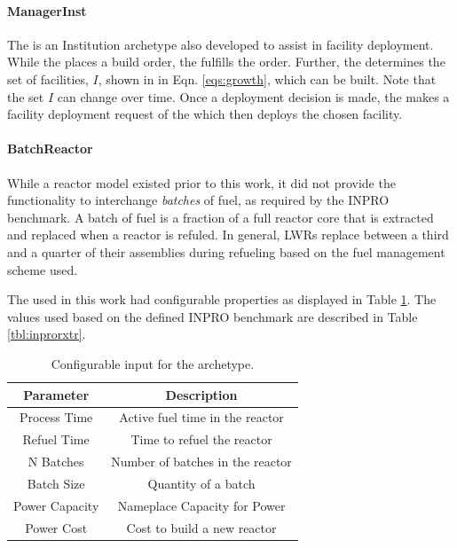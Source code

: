 \paragraph{ManagerInst}

The  is an Institution archetype also developed to assist
in facility deployment. While the  places a build order, the
 fulfills the order. Further, the 
determines the set of facilities, $I$, shown in in Eqn. \ref{eqs:growth}, which
can be built. Note that the set $I$ can change over time. Once a deployment
decision is made, the  makes a facility deployment request of
the  which then deploys the chosen facility.

\paragraph{BatchReactor}

While a reactor model existed prior to this work, it did not provide the
functionality to interchange \textit{batches} of fuel, as required by the INPRO
benchmark. A batch of fuel is a fraction of a full reactor core that is
extracted and replaced when a reactor is refuled. In general, LWRs replace
between a third and a quarter of their assemblies during refueling based on the
fuel management scheme used.

The  used in this work had configurable properties as
displayed in Table \ref{tbl:batchrxtr}. The values used based on the defined
INPRO benchmark are described in Table \ref{tbl:inprorxtr}.

\begin{table}[h]
\centering
\begin{tabular}{cc}
Parameter      & Description                     \\ \hline
Process Time   & Active fuel time in the reactor                        \\
Refuel Time    & Time to refuel the reactor                              \\
N Batches      & Number of batches in the reactor                         \\
Batch Size     & Quantity of a batch                                 \\
Power Capacity & Nameplace Capacity for Power                          \\
Power Cost     & Cost to build a new reactor      \\ \hline
\end{tabular}
\caption{Configurable input for the  archetype.}
\label{tbl:batchrxtr}
\end{table}

